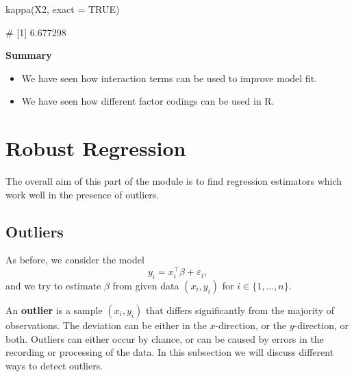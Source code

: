 \documentclass[
  a4paper,
]{article}
\newenvironment{Shaded}{\begin{snugshade}}{\end{snugshade}}
\newcommand{\AttributeTok}[1]{\textcolor[rgb]{0.77,0.63,0.00}{#1}}
\newcommand{\ConstantTok}[1]{\textcolor[rgb]{0.00,0.00,0.00}{#1}}
\newcommand{\FunctionTok}[1]{\textcolor[rgb]{0.00,0.00,0.00}{#1}}
\newcommand{\NormalTok}[1]{#1}
\providecommand{\tightlist}{%
  \setlength{\itemsep}{0pt}\setlength{\parskip}{0pt}}
\theoremstyle{definition}
\theoremstyle{definition}
\theoremstyle{definition}
\theoremstyle{definition}
\theoremstyle{remark}
\begin{document}
\begin{Shaded}
\begin{Highlighting}[]
\FunctionTok{kappa}\NormalTok{(X2, }\AttributeTok{exact =} \ConstantTok{TRUE}\NormalTok{)}
\end{Highlighting}
\end{Shaded}

\begin{Shaded}
\begin{Highlighting}[]
\NormalTok{\# [1] 6.677298}
\end{Highlighting}
\end{Shaded}

\textbf{Summary}

\begin{itemize}
\tightlist
\item
  We have seen how interaction terms can be used to improve model
  fit.
\item
  We have seen how different factor codings can be used in R.
\end{itemize}

\clearpage

\hypertarget{S17-robust}{%
\section{Robust Regression}\label{S17-robust}}

The overall aim of this part of the module is to find regression
estimators which work well in the presence of outliers.

\hypertarget{outliers}{%
\subsection{Outliers}\label{outliers}}

As before, we consider the model
\begin{equation*}
  y_i
  = x_i^\top \beta + \varepsilon_i,
\end{equation*}
and we try to estimate \(\beta\) from given data \((x_i, y_i)\) for
\(i\in \{1, \ldots, n\}\).

An \textbf{outlier} is a sample \((x_i, y_i)\) that differs significantly
from the majority of observations. The deviation can be either in the
\(x\)-direction, or the \(y\)-direction, or both. Outliers can either
occur by chance, or can be caused by errors in the recording or processing
of the data. In this subsection we will discuss different ways to detect
outliers.
\end{document}
